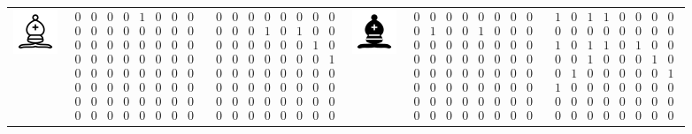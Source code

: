 \begin{table}[]
\begin{tabular}{c c c | c c c}
\includegraphics[scale=0.5]{fig/pieces/B} & 
$\begin{smallmatrix}0&0&0&0&1&0&0&0\\0&0&0&0&0&0&0&0\\0&0&0&0&0&0&0&0\\0&0&0&0&0&0&0&0\\0&0&0&0&0&0&0&0\\0&0&0&0&0&0&0&0\\0&0&0&0&0&0&0&0\\0&0&0&0&0&0&0&0\end{smallmatrix}$&
$\begin{smallmatrix}0&0&0&0&0&0&0&0\\0&0&0&1&0&1&0&0\\0&0&0&0&0&0&1&0\\0&0&0&0&0&0&0&1\\0&0&0&0&0&0&0&0\\0&0&0&0&0&0&0&0\\0&0&0&0&0&0&0&0\\0&0&0&0&0&0&0&0\end{smallmatrix}$ &

\includegraphics[scale=0.5]{fig/pieces/b} &
$\begin{smallmatrix}0&0&0&0&0&0&0&0\\0&1&0&0&1&0&0&0\\0&0&0&0&0&0&0&0\\0&0&0&0&0&0&0&0\\0&0&0&0&0&0&0&0\\0&0&0&0&0&0&0&0\\0&0&0&0&0&0&0&0\\0&0&0&0&0&0&0&0\end{smallmatrix}$&
$\begin{smallmatrix}1&0&1&1&0&0&0&0\\0&0&0&0&0&0&0&0\\1&0&1&1&0&1&0&0\\0&0&1&0&0&0&1&0\\0&1&0&0&0&0&0&1\\1&0&0&0&0&0&0&0\\0&0&0&0&0&0&0&0\\0&0&0&0&0&0&0&0\end{smallmatrix}$ \\ [1cm]


\end{tabular}
\end{table}
